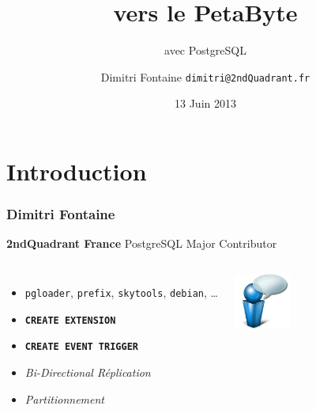 \documentclass{beamer}
\title{vers le PetaByte}
\subtitle{avec PostgreSQL}
\author{Dimitri Fontaine \texttt{dimitri@2ndQuadrant.fr}}
\date{13 Juin 2013}
\begin{document}
\frame{\titlepage}

\section{Introduction}

\begin{frame}[fragile]
  \frametitle{Dimitri Fontaine}

  \begin{center}
    \textbf{2ndQuadrant France}
    \linebreak
    PostgreSQL Major Contributor
  \end{center}
  \linebreak

\begin{columns}[c]

  \begin{itemize}
   \item \texttt{pgloader}, \texttt{prefix}, \texttt{skytools}, \texttt{debian}, …
   \item \texttt{\textbf{CREATE EXTENSION}}
   \item \texttt{\textbf{CREATE EVENT TRIGGER}}
   \item \textit{Bi-Directional Réplication}
   \item \textit{Partitionnement}
  \end{itemize}  

\begin{center}
  \includegraphics[height=5em]{bulle-blue-icon.png}
\end{center}
\end{columns}
\end{frame}
\end{document}

